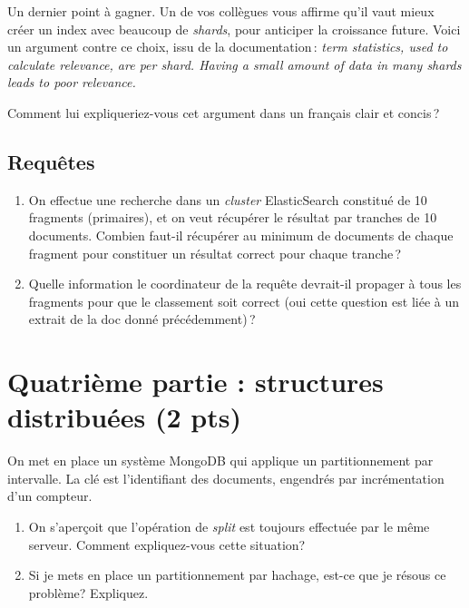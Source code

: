 \documentclass[11pt,a4paper]{article}
\begin{document}
Un dernier point à gagner. Un de vos collègues vous affirme qu'il vaut mieux
créer un index avec beaucoup de \textit{shards}, pour anticiper la croissance future. Voici
un argument contre ce choix, issu de la documentation\,:
\textit{term statistics, used to calculate relevance, are per shard. Having a small amount of 
data in many shards leads to poor relevance.} 

Comment lui expliqueriez-vous cet argument dans un français clair et concis\,?

\subsection*{Requêtes}

\begin{enumerate}

  \item On effectue une recherche dans un \textit{cluster} ElasticSearch constitué de 10 fragments (primaires), et on veut récupérer
      le résultat par tranches de 10 documents. Combien faut-il récupérer au minimum de documents de chaque 
      fragment pour constituer un résultat correct pour chaque tranche\,? 

  \item Quelle information le coordinateur de la requête
    devrait-il propager à tous les fragments pour que le classement soit correct (oui cette question est liée
    à un extrait de la doc donné précédemment)\,? 

 \end{enumerate}


\section*{Quatrième partie : structures distribuées (2 pts)}

On met en place un système MongoDB qui applique un partitionnement par intervalle. La clé est 
l'identifiant des documents, engendrés par incrémentation d'un compteur.


\begin{enumerate}

  \item On s'aperçoit que l'opération de \textit{split} est toujours effectuée par le même serveur.
      Comment expliquez-vous cette situation?

  \item Si je mets en place un partitionnement par hachage, est-ce que je résous ce problème? Expliquez.

 \end{enumerate}
\end{document}
